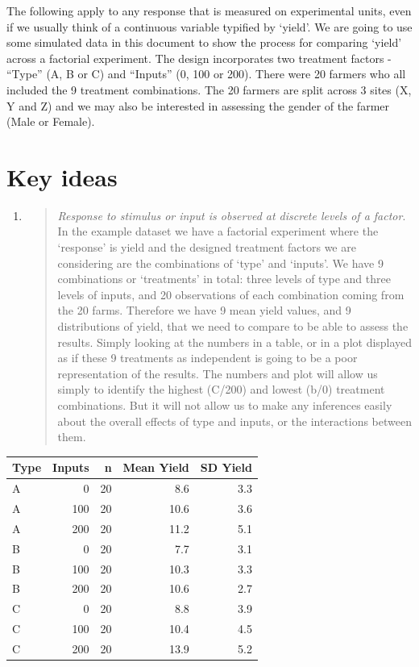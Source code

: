 \documentclass[
  titlepage]{book}
\begin{document}
The following apply to any response that is measured on experimental units, even if we usually think of a continuous variable typified by `yield'. We are going to use some simulated data in this document to show the process for comparing `yield' across a factorial experiment. The design incorporates two treatment factors - ``Type'' (A, B or C) and ``Inputs'' (0, 100 or 200). There were 20 farmers who all included the 9 treatment combinations. The 20 farmers are split across 3 sites (X, Y and Z) and we may also be interested in assessing the gender of the farmer (Male or Female).

\hypertarget{key-ideas}{%
\section{Key ideas}\label{key-ideas}}

\begin{enumerate}
\def\labelenumi{\arabic{enumi}.}
\item
  \begin{quote}
  \emph{Response to stimulus or input is observed at discrete levels of a factor}. In the example dataset we have a factorial experiment where the `response' is yield and the designed treatment factors we are considering are the combinations of `type' and `inputs'.
  We have 9 combinations or `treatments' in total: three levels of type and three levels of inputs, and 20 observations of each combination coming from the 20 farms. Therefore we have 9 mean yield values, and 9 distributions of yield, that we need to compare to be able to assess the results. Simply looking at the numbers in a table, or in a plot displayed as if these 9 treatments as independent is going to be a poor representation of the results. The numbers and plot will allow us simply to identify the highest (C/200) and lowest (b/0) treatment combinations. But it will not allow us to make any inferences easily about the overall effects of type and inputs, or the interactions between them.
  \end{quote}
\end{enumerate}

\begin{tabular}{l|r|r|r|r}
\hline
Type & Inputs & n & Mean Yield & SD Yield\\
\hline
A & 0 & 20 & 8.6 & 3.3\\
\hline
A & 100 & 20 & 10.6 & 3.6\\
\hline
A & 200 & 20 & 11.2 & 5.1\\
\hline
B & 0 & 20 & 7.7 & 3.1\\
\hline
B & 100 & 20 & 10.3 & 3.3\\
\hline
B & 200 & 20 & 10.6 & 2.7\\
\hline
C & 0 & 20 & 8.8 & 3.9\\
\hline
C & 100 & 20 & 10.4 & 4.5\\
\hline
C & 200 & 20 & 13.9 & 5.2\\
\hline
\end{tabular}
\end{document}
